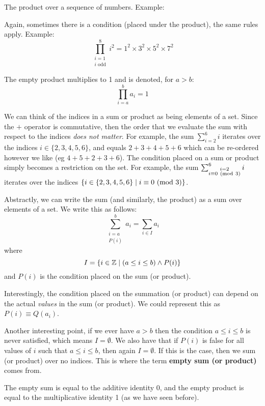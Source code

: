 \documentclass[main.tex]{subfiles}
\begin{document}
\begin{defn}
	The product over a sequence of numbers. Example: \[\]
	
	Again, sometimes there is a condition (placed under the product), the same rules apply. Example: \[\prod_{\substack{i = 1 \\ i \text{ odd}}}^{8} i^2 = 1^2 \times 3^2 \times 5^2 \times 7^2\]
\end{defn}

The empty product multiplies to 1 and is denoted, for \(a > b\): \[\prod_{i = a}^{b} a_i = 1\]

\begin{rem}
	We can think of the indices in a sum or product as being elements of a set. Since the \(+\) operator is commutative, then the order that we evaluate the sum with respect to the indices \textit{does not matter}. For example, the sum \(\sum_{i=2}^{6} i\) iterates over the indices \(i \in \{2,3,4,5,6\}\), and equals \(2+3+4+5+6\) which can be re-ordered however we like (eg \(4+5+2+3+6\)). The condition placed on a sum or product simply becomes a restriction on the set. For example, the sum \(\sum_{\substack{i=2 \\ i \equiv 0 \ (\mathrm{mod}\ 3)}}^{6} i\) iterates over the indices \(\{i \in \{2,3,4,5,6\} \mid i \equiv 0 \ (\mathrm{mod}\ 3)\}\).
	
	Abstractly, we can write the sum (and similarly, the product) as a sum over elements of a set. We write this as follows: \[\sum_{\substack{i=a \\ P(i)}}^{b} a_i = \sum_{i \in I} a_i\] where \[I = \{i \in \mathbb{Z} \mid (a \leq i \leq b) \land P(i)\}\] and \(P(i)\) is the condition placed on the sum (or product).
	
	Interestingly, the condition placed on the summation (or product) can depend on the actual \textit{values} in the sum (or product). We could represent this as \(P(i) \equiv Q(a_i)\).
	
	Another interesting point, if we ever have \(a > b\) then the condition \(a \leq i \leq b\) is never satisfied, which means \(I = \emptyset\). We also have that if \(P(i)\) is false for all values of \(i\) such that \(a \leq i \leq b\), then again \(I = \emptyset\). If this is the case, then we sum (or product) over no indices. This is where the term \textbf{empty sum (or product)} comes from.
	
	The empty sum is equal to the additive identity 0, and the empty product is equal to the multiplicative identity 1 (as we have seen before).
\end{rem}
\end{document}
